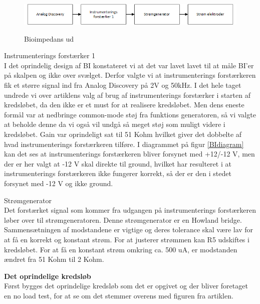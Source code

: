 \begin{figure}[H]
\centering
{\includegraphics[width=\linewidth]
{Figure/analyse1}}
\caption{Bioimpedans ud}
\label{fig:analyse1}
\end{figure}

Instrumenterings forstærker 1\\
I det oprindelig design af BI konstateret vi at det var lavet lavet til at måle BI'er på skalpen og ikke over svælget. Derfor valgte vi at instrumenterings forstærkeren fik et større signal ind fra Analog Discovery på 2V og 50kHz. I det hele taget undrede vi over artiklens valg af brug af instrumenterings forstærker i starten af kredsløbet, da den ikke er et must for at realisere kredsløbet. Men dens eneste formål var at nedbringe common-mode støj fra funktions generatoren, så vi valgte at beholde denne da vi også vil undgå så meget støj som muligt videre i kredsløbet. Gain var oprindeligt sat til 51 Kohm hvilket giver det dobbelte af hvad instrumenterings forstærkeren tilføre. I diagrammet på figur \ref{BIdiagram} kan det ses at instrumenterings forstærkeren bliver forsynet med +12/-12 V, men der er her valgt at -12 V skal direkte til ground, hvilket har resulteret i at instrumenterings forstærkeren ikke fungerer korrekt, så der er den i stedet forsynet med -12 V og ikke ground.  





Strømgenerator\\
Det forstærket signal som kommer fra udgangen på instrumenterings forstærkeren løber over til strømgeneratoren. Denne strømgenerator er en Howland bridge. Sammensætningen af modstandene er vigtige og deres tolerance skal være lav for at få en korrekt og konstant strøm. For at justerer strømmen kan R5 udskiftes i kredsløbet. For at få en konstant strøm omkring ca. 500 uA, er modstanden ændret fra 51 Kohm til 2 Kohm.  

\textbf{Det oprindelige kredsløb}\\
Først bygges det oprindelige kredsløb som det er opgivet og der bliver foretaget en no load test, for at se om det stemmer overens med figuren fra artiklen.

